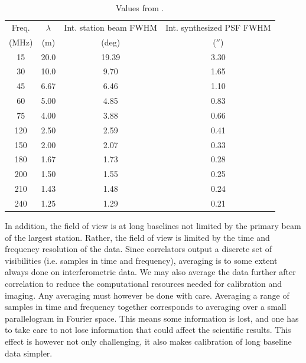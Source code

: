 \begin{table}[h]
\centering
\begin{tabular}{cccc}
Freq. & $\lambda$ & Int. station beam FWHM & Int. synthesized PSF FWHM\\
(MHz) & (m) & (deg) & ($''$)\\
\hline
15  &  20.0 &  19.39& 3.30 \\
30  &  10.0 &  9.70&   1.65\\
45  &  6.67 &  6.46&   1.10\\
60  &  5.00 &  4.85&   0.83 \\
75  &  4.00 &  3.88&   0.66\\
120 &  2.50 &  2.59&   0.41\\
150 &  2.00 &  2.07&   0.33\\
180 &  1.67 &  1.73&   0.28\\
200 &  1.50 &  1.55&   0.25\\
210 &  1.43 &  1.48&   0.24\\
240 &  1.25 &  1.29&   0.21
\end{tabular}
\caption{Values from \cite{vanhaarlem2013}.
\label{tab:res}}
\end{table}

In addition, the field of view is at long baselines not limited by the primary
beam of the largest station. Rather, the field of view is limited by the time
and frequency resolution of the data.  Since correlators output a discrete set
of visibilities (i.e. samples in time and frequency), averaging is to some
extent always done on interferometric data. We may also average the data
further after correlation to reduce the computational resources needed for
calibration and imaging. Any averaging must however be done with care.
Averaging a range of samples in time and frequency together corresponds to
averaging over a small parallelogram in Fourier space. This means some
information is lost, and one has to take care to not lose information that
could affect the scientific results.
This effect is however not only challenging, it also makes calibration
of long baseline data simpler. 

